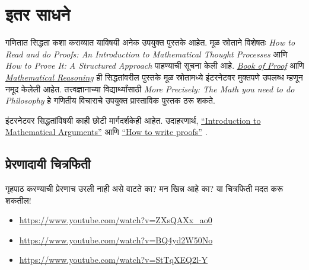 \documentclass[../../../include/open-logic-section]{subfiles}
\begin{document}

\section{इतर साधने}

गणितात सिद्धता कशा कराव्यात याविषयी अनेक उपयुक्त पुस्तके आहेत. मूळ स्रोताने विशेषतः \emph{How to Read and do Proofs: An Introduction to Mathematical Thought Processes} \citep{Solow2013} आणि \emph{How to Prove It: A Structured Approach} \citep{Velleman2019} पाहण्याची सूचना केली आहे. \href{http://www.people.vcu.edu/~rhammack/BookOfProof/BookOfProof.pdf}{\emph{Book of Proof}} \citep{Hammack2013} आणि \href{https://scholarworks.gvsu.edu/books/7/}{\emph{Mathematical Reasoning}} \citep{Sandstrum2019} ही सिद्धतांवरील पुस्तके मूळ स्रोतामध्ये इंटरनेटवर मुक्तपणे उपलब्ध म्हणून नमूद केलेली आहेत. तत्त्वज्ञानाच्या विद्यार्थ्यांसाठी \emph{More Precisely: The Math you need to do Philosophy} \citep{Steinhart2018} हे गणितीय विचाराचे उपयुक्त प्रास्ताविक पुस्तक ठरू शकते.

इंटरनेटवर सिद्धतांविषयी काही छोटी मार्गदर्शकेही आहेत. उदाहरणार्थ, \href{https://math.berkeley.edu/~hutching/teach/proofs.pdf}{“Introduction to Mathematical Arguments”} \citep{Hutchings2003} आणि \href{https://eugeniacheng.com/wp-content/uploads/2017/02/cheng-proofguide.pdf}{“How to write proofs”} \citep{Cheng2004}.

\subsection{प्रेरणादायी चित्रफिती}

गृहपाठ करण्याची प्रेरणाच उरली नाही असे वाटते का? मन खिन्न आहे का? या चित्रफिती मदत करू शकतील!

\begin{itemize}
\item \url{https://www.youtube.com/watch?v=ZXsQAXx_ao0}
\item \url{https://www.youtube.com/watch?v=BQ4yd2W50No}
\item \url{https://www.youtube.com/watch?v=StTqXEQ2l-Y}
\end{itemize}
\end{document}
